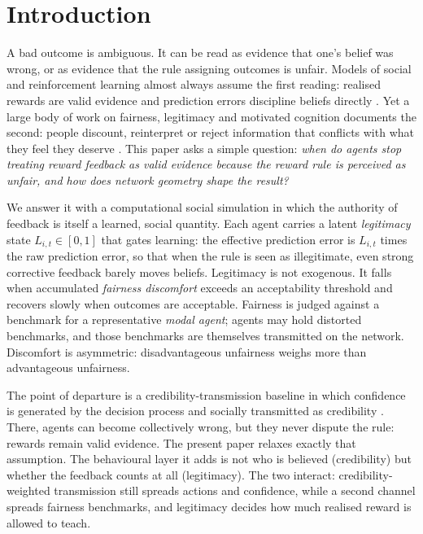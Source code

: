 \documentclass[11pt]{article}
\newcommand{\1}{\mathbf{1}}
\begin{document}
\section{Introduction}
A bad outcome is ambiguous. It can be read as evidence that one's belief was
wrong, or as evidence that the rule assigning outcomes is unfair. Models of
social and reinforcement learning almost always assume the first reading:
realised rewards are valid evidence and prediction errors discipline beliefs
directly \citep{SuttonBarto2018,DeGroot1974,GolubJackson2010}. Yet a large body
of work on fairness, legitimacy and motivated cognition documents the second:
people discount, reinterpret or reject information that conflicts with what they
feel they deserve \citep{Rabin1993Fairness,FehrSchmidt1999,Tyler2006,Kunda1990,Festinger1957}.
This paper asks a simple question: \emph{when do agents stop treating reward
feedback as valid evidence because the reward rule is perceived as unfair, and
how does network geometry shape the result?}

We answer it with a computational social simulation in which the authority of
feedback is itself a learned, social quantity. Each agent carries a latent
\emph{legitimacy} state $L_{i,t}\in[0,1]$ that gates learning: the effective
prediction error is $L_{i,t}$ times the raw prediction error, so that when the
rule is seen as illegitimate, even strong corrective feedback barely moves
beliefs. Legitimacy is not exogenous. It falls when accumulated \emph{fairness
discomfort} exceeds an acceptability threshold and recovers slowly when outcomes
are acceptable. Fairness is judged against a benchmark for a representative
\emph{modal agent}; agents may hold distorted benchmarks, and those benchmarks
are themselves transmitted on the network. Discomfort is asymmetric:
disadvantageous unfairness weighs more than advantageous unfairness.

The point of departure is a credibility-transmission baseline in which confidence
is generated by the decision process and socially transmitted as credibility
\citep{BontempsBanerjee2026}. There, agents can become collectively wrong, but
they never dispute the rule: rewards remain valid evidence. The present paper
relaxes exactly that assumption. The behavioural layer it adds is not who is
believed (credibility) but whether the feedback counts at all (legitimacy). The
two interact: credibility-weighted transmission still spreads actions and
confidence, while a second channel spreads fairness benchmarks, and legitimacy
decides how much realised reward is allowed to teach.
\end{document}
